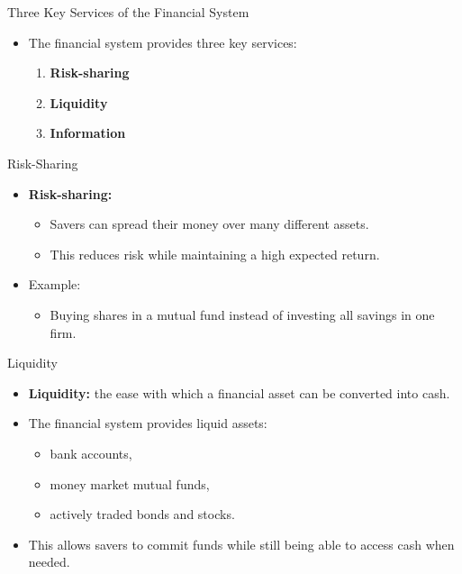 \documentclass[aspectratio=169]{beamer}
\begin{document}
\begin{frame}{Three Key Services of the Financial System}
\transfade
\begin{itemize}[<+->]
  \item The financial system provides three key services:
  \begin{enumerate}[<+->]
    \item \textbf{Risk-sharing}
    \item \textbf{Liquidity}
    \item \textbf{Information}
  \end{enumerate}
\end{itemize}
\end{frame}

\begin{frame}{Risk-Sharing}
\transfade
\begin{itemize}[<+->]
  \item \textbf{Risk-sharing:}
  \begin{itemize}[<+->]
    \item Savers can spread their money over many different assets.
    \item This reduces risk while maintaining a high expected return.
  \end{itemize}
  \item Example:
  \begin{itemize}[<+->]
    \item Buying shares in a mutual fund instead of investing all savings in one firm.
  \end{itemize}
\end{itemize}
\end{frame}

\begin{frame}{Liquidity}
\transfade
\begin{itemize}[<+->]
  \item \textbf{Liquidity:} the ease with which a financial asset can be converted into cash.
  \item The financial system provides liquid assets:
  \begin{itemize}[<+->]
    \item bank accounts,
    \item money market mutual funds,
    \item actively traded bonds and stocks.
  \end{itemize}
  \item This allows savers to commit funds while still being able to access cash when needed.
\end{itemize}
\end{frame}
\end{document}
